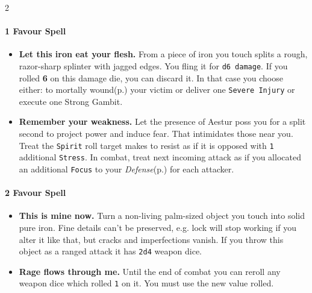 \begin{multicols*}{2}
\newcolumn{}


\paragraph{1 Favour Spell}
\begin{itemize}
    \item [\ding{108}] \textbf{Let this iron eat your flesh.} From a piece of iron you touch splits a rough, razor-sharp splinter with jagged edges. You fling it for \texttt{d6 damage}. 
    If you rolled \textbf{6} on this damage die, you can discard it. In that case you choose either: to mortally wound(p.\pageref*{sec:hopefear}) your victim or deliver one \texttt{Severe Injury} or execute one Strong Gambit. 
    \item [\ding{108}] \textbf{Remember your weakness.} Let the presence of Aestur poss you for a split second to project power and induce fear. 
    That intimidates those near you. Treat the \texttt{Spirit} roll target makes to resist as if it is opposed with \texttt{1} additional \texttt{Stress}. 
    In combat, treat next incoming attack as if you allocated an additional \texttt{Focus} to your \emph{Defense}(p.\pageref*{sec:basic}) for each attacker.
\end{itemize}

\paragraph{2 Favour Spell}
\begin{itemize}
    \item [\ding{108}] \textbf{This is mine now.} Turn a non-living palm-sized object you touch into solid pure iron. 
    Fine details can't be preserved, e.g. lock will stop working if you alter it like that, but cracks and imperfections vanish. 
    If you throw this object as a ranged attack it has \texttt{2d4} weapon dice. 
    \item [\ding{108}] \textbf{Rage flows through me.} Until the end of combat you can reroll any weapon dice which rolled \texttt{1} on it. You must use the new value rolled.
\end{itemize}



\end{multicols*}
